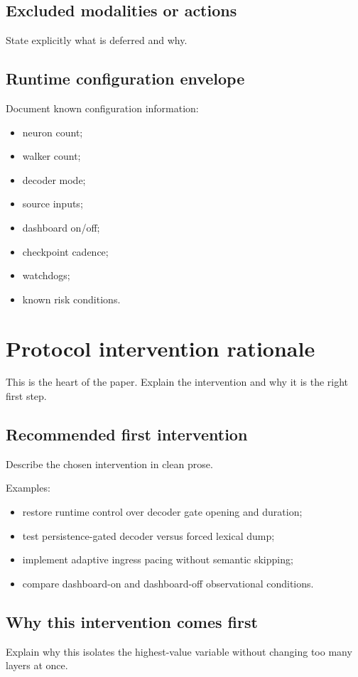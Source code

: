 \documentclass[11pt]{article}
\begin{document}
\subsection{Excluded modalities or actions}
State explicitly what is deferred and why.

\subsection{Runtime configuration envelope}
Document known configuration information:
\begin{itemize}[leftmargin=1.5em]
  \item neuron count;
  \item walker count;
  \item decoder mode;
  \item source inputs;
  \item dashboard on/off;
  \item checkpoint cadence;
  \item watchdogs;
  \item known risk conditions.
\end{itemize}

\section{Protocol intervention rationale}

This is the heart of the paper. Explain the intervention and why it is the right first step.

\subsection{Recommended first intervention}
Describe the chosen intervention in clean prose.

Examples:
\begin{itemize}[leftmargin=1.5em]
  \item restore runtime control over decoder gate opening and duration;
  \item test persistence-gated decoder versus forced lexical dump;
  \item implement adaptive ingress pacing without semantic skipping;
  \item compare dashboard-on and dashboard-off observational conditions.
\end{itemize}

\subsection{Why this intervention comes first}
Explain why this isolates the highest-value variable without changing too many layers at once.
\end{document}
